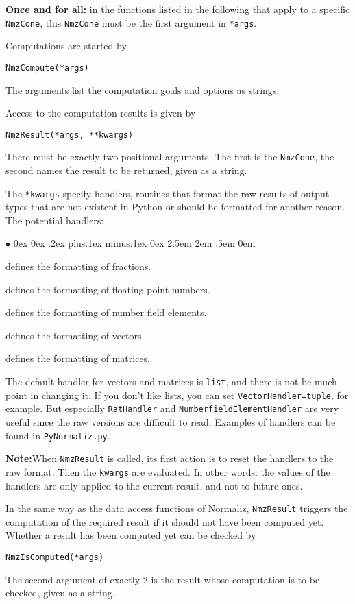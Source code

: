 \documentclass[12pt,a4paper]{scrartcl}
\newcommand{\stdli}{ \topsep0ex \partopsep0ex %
\parsep.2ex plus.1ex minus.1ex \itemsep0ex%
\leftmargin2.5em \labelwidth2em \labelsep.5em \rightmargin0em}%
\renewenvironment{itemize}{\begin{list}{{$\bullet$}}{\stdli}}{\end{list}}
\theoremstyle{definition}
\def\itemtt[#1]{\item[\textbf{\ttt{#1}}]}
\def\ttt{\texttt}
\begin{document}
\begin{small}
\textbf{Once and for all:} in the functions listed in the following that apply to a specific \verb|NmzCone|, this \verb|NmzCone| must be the first argument in \verb|*args|.

Computations are started by
\begin{Verbatim}
NmzCompute(*args)
\end{Verbatim}
The arguments list the computation goals and options as strings.

Access to the computation results is given by
\begin{Verbatim}
NmzResult(*args, **kwargs)
\end{Verbatim}
There must be exactly two positional arguments. The first is the \verb|NmzCone|, the second names the result to be returned, given as a string.

The \verb|*kwargs| specify handlers, routines that format the raw results of output types that are not existent in Python or should be formatted for another reason. The potential handlers:
\begin{itemize}
	\itemtt[RatHandler] defines the formatting of fractions.
	
	\itemtt[FloatHandler] defines the formatting of floating point numbers.
	
	\itemtt[NumberfieldElementHandler] defines the formatting of number field elements.
	
	\itemtt[VectorHandler] defines the formatting of vectors.
	
	\itemtt[MatrixHandler] defines the formatting of matrices.
\end{itemize}

The default handler for vectors and matrices is \verb|list|, and there is not be much point in changing it. If you don't like lists, you can set \verb|VectorHandler=tuple|, for example. But especially \verb|RatHandler| and \verb|NumberfieldElementHandler| are very useful since the raw versions are difficult to read. Examples of handlers can be found in \verb|PyNormaliz.py|.

\textbf{Note:}\enspace When \verb|NmzResult| is called, its first action is to reset the handlers to the raw format. Then the \verb|kwargs| are evaluated. In other words: the values of the handlers are only applied to the current result, and not to future ones.

In the same way as the data access functions of Normaliz, \verb|NmzResult| triggers the computation of the required result if it should not have been computed yet. Whether a result has been computed yet can be checked by
\begin{Verbatim}
NmzIsComputed(*args)
\end{Verbatim}
The second argument of exactly $2$ is the result whose computation is to be checked, given as a string.


\end{small}
\end{document}
